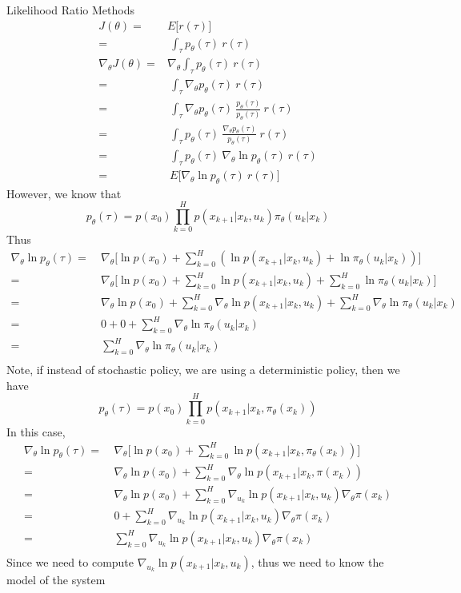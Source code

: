 \documentclass[9pt]{article}
\begin{document}
Likelihood Ratio Methods
\[
\begin{split}
	J(\theta) = & E \big[r(\tau)\big] \\
	= &\ \int_{\tau} p_{\theta}(\tau)\ r(\tau)\\
	\nabla_{\theta} J(\theta) = & \nabla_{\theta} \int_{\tau} p_{\theta}(\tau)\ r(\tau)\\
	= &\ \int_{\tau} \nabla_{\theta} p_{\theta}(\tau)\ r(\tau)\\
	= &\ \int_{\tau} \nabla_{\theta} p_{\theta}(\tau)\ \frac{p_{\theta}(\tau)}{p_{\theta}(\tau)}\ r(\tau)\\
	= &\ \int_{\tau} p_{\theta}(\tau)\ \frac{\nabla_{\theta} p_{\theta}(\tau)}{p_{\theta}(\tau)}\ r(\tau)\\
	= &\ \int_{\tau} p_{\theta}(\tau)\ \nabla_{\theta} \ln p_{\theta}(\tau)\ r(\tau)\\
	= &\ E \big[ \nabla_{\theta} \ln p_{\theta}(\tau)\ r(\tau) \big]
\end{split}
\]
However, we know that
\[
p_{\theta}(\tau) = p(x_0) \prod_{k=0}^{H}p(x_{k+1}|x_k,u_k)\pi_{\theta}(u_k|x_k)
\]
Thus
\[
\begin{split}
\nabla_{\theta} \ln p_{\theta}(\tau) = &\ \nabla_{\theta} \big[ \ln p(x_0) + \sum_{k=0}^{H} (\ln p(x_{k+1}|x_k,u_k) + \ln \pi_{\theta}(u_k|x_k))\big]\\
= &\ \nabla_{\theta} \big[ \ln p(x_0) + \sum_{k=0}^{H} \ln p(x_{k+1}|x_k,u_k) + \sum_{k=0}^{H} \ln \pi_{\theta}(u_k|x_k)\big]\\
= &\ \nabla_{\theta} \ln p(x_0) + \sum_{k=0}^{H} \nabla_{\theta} \ln p(x_{k+1}|x_k,u_k) + \sum_{k=0}^{H} \nabla_{\theta} \ln \pi_{\theta}(u_k|x_k)\\
= &\ 0 + 0 + \sum_{k=0}^{H} \nabla_{\theta} \ln \pi_{\theta}(u_k|x_k)\\
= &\ \sum_{k=0}^{H} \nabla_{\theta} \ln \pi_{\theta}(u_k|x_k)\\
\end{split}
\]
Note, if instead of stochastic policy, we are using a deterministic policy, then we have 
\[
p_{\theta}(\tau) = p(x_0) \prod_{k=0}^{H}p(x_{k+1}|x_k,\pi_{\theta}(x_k))
\]
In this case, 
\[
\begin{split}
\nabla_{\theta} \ln p_{\theta}(\tau) = &\ \nabla_{\theta} \big[ \ln p(x_0) + \sum_{k=0}^{H} \ln p(x_{k+1}|x_k,\pi_{\theta}(x_k))\big]\\
= &\ \nabla_{\theta} \ln p(x_0) + \sum_{k=0}^{H} \nabla_{\theta} \ln p(x_{k+1}|x_k,\pi(x_k))\\
= &\ \nabla_{\theta} \ln p(x_0) + \sum_{k=0}^{H} \nabla_{u_k} \ln p(x_{k+1}|x_k,u_k) \nabla_{\theta} \pi(x_k)\\
= &\ 0 +  \sum_{k=0}^{H} \nabla_{u_k} \ln p(x_{k+1}|x_k,u_k) \nabla_{\theta} \pi(x_k)\\
= &\ \sum_{k=0}^{H} \nabla_{u_k} \ln p(x_{k+1}|x_k,u_k) \nabla_{\theta} \pi(x_k)\\
\end{split}
\]
Since we need to compute $\nabla_{u_k} \ln p(x_{k+1}|x_k,u_k)$, thus we need to know the model of the system
\end{document}

